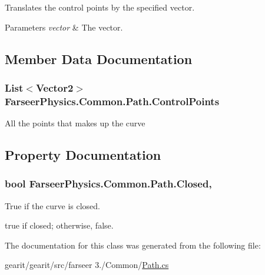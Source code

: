 Translates the control points by the specified vector. 


\begin{DoxyParams}{Parameters}
{\em vector} & The vector.\\
\hline
\end{DoxyParams}


\subsection{Member Data Documentation}
\hypertarget{class_farseer_physics_1_1_common_1_1_path_a5b39543e094e1212637320b8001e24c3}{
\subsubsection[{Control\+Points}]{\setlength{\rightskip}{0pt plus 5cm}List$<$Vector2$>$ Farseer\+Physics.\+Common.\+Path.\+Control\+Points}}\label{class_farseer_physics_1_1_common_1_1_path_a5b39543e094e1212637320b8001e24c3}


All the points that makes up the curve 



\subsection{Property Documentation}
\hypertarget{class_farseer_physics_1_1_common_1_1_path_a753a9d624f4da3f651f130cb6addc091}{
\subsubsection[{Closed}]{\setlength{\rightskip}{0pt plus 5cm}bool Farseer\+Physics.\+Common.\+Path.\+Closed\hspace{0.3cm}{\ttfamily [get]}, {\ttfamily [set]}}}\label{class_farseer_physics_1_1_common_1_1_path_a753a9d624f4da3f651f130cb6addc091}


True if the curve is closed. 

{\ttfamily true} if closed; otherwise, {\ttfamily false}.

The documentation for this class was generated from the following file\+:\begin{DoxyCompactItemize}
\item 
gearit/gearit/src/farseer 3./\+Common/\hyperlink{_path_8cs}{Path.\+cs}\end{DoxyCompactItemize}
